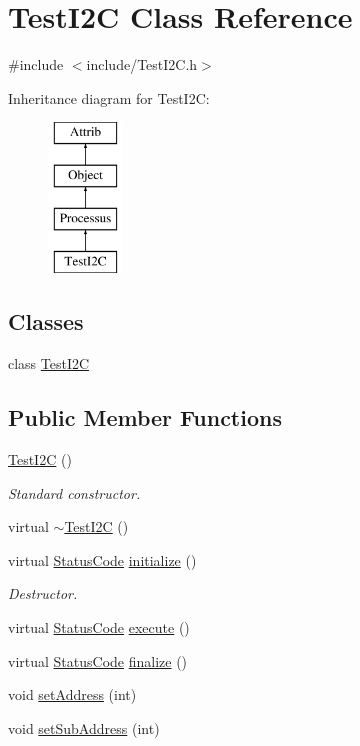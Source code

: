 \hypertarget{classTestI2C}{}\section{Test\+I2C Class Reference}
\label{classTestI2C}


{\ttfamily \#include $<$include/\+Test\+I2\+C.\+h$>$}

Inheritance diagram for Test\+I2C\+:\begin{figure}[H]
\begin{center}
\leavevmode
\includegraphics[height=4.000000cm]{classTestI2C}
\end{center}
\end{figure}
\subsection*{Classes}
\begin{DoxyCompactItemize}
\item 
class \hyperlink{classTestI2C_1_1TestI2C}{Test\+I2C}
\end{DoxyCompactItemize}
\subsection*{Public Member Functions}
\begin{DoxyCompactItemize}
\item 
\hyperlink{classTestI2C_a0fd4ba8d4696e9dd699b365ce91115e7}{Test\+I2C} ()
\begin{DoxyCompactList}\small\item\em Standard constructor. \end{DoxyCompactList}\item 
virtual \hyperlink{classTestI2C_a60812c524e19a048534d0b110d290a9b}{$\sim$\+Test\+I2C} ()
\item 
virtual \hyperlink{classStatusCode}{Status\+Code} \hyperlink{classTestI2C_a3f928813a5e26e0f9b6d851e16781a33}{initialize} ()
\begin{DoxyCompactList}\small\item\em Destructor. \end{DoxyCompactList}\item 
virtual \hyperlink{classStatusCode}{Status\+Code} \hyperlink{classTestI2C_aafef0778386d8a60aa5fa6067ef7ea00}{execute} ()
\item 
virtual \hyperlink{classStatusCode}{Status\+Code} \hyperlink{classTestI2C_af7f36cd1607eb089a6de1bee57c388e7}{finalize} ()
\item 
void \hyperlink{classTestI2C_a55f7e0dde864dc0db6dc62d4f8d26c90}{set\+Address} (int)
\item 
void \hyperlink{classTestI2C_a25776d1fdac40d7285219337ef943b5d}{set\+Sub\+Address} (int)
\end{DoxyCompactItemize}
